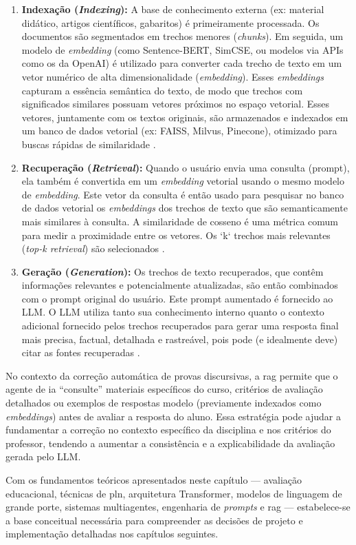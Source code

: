 \begin{enumerate}
    \item \textbf{Indexação (\textit{Indexing}):} A base de conhecimento externa (ex: material didático, artigos científicos, gabaritos) é primeiramente processada. Os documentos são segmentados em trechos menores (\textit{chunks}). Em seguida, um modelo de \textit{embedding} (como Sentence-BERT, SimCSE, ou modelos via APIs como os da OpenAI) é utilizado para converter cada trecho de texto em um vetor numérico de alta dimensionalidade (\textit{embedding}). Esses \textit{embeddings} capturam a essência semântica do texto, de modo que trechos com significados similares possuam vetores próximos no espaço vetorial. Esses vetores, juntamente com os textos originais, são armazenados e indexados em um banco de dados vetorial (ex: FAISS, Milvus, Pinecone), otimizado para buscas rápidas de similaridade \cite{gao_retrieval-augmented_2024, khattab_colbert_2020}.

    \item \textbf{Recuperação (\textit{Retrieval}):} Quando o usuário envia uma consulta (prompt), ela também é convertida em um \textit{embedding} vetorial usando o mesmo modelo de \textit{embedding}. Este vetor da consulta é então usado para pesquisar no banco de dados vetorial os \textit{embeddings} dos trechos de texto que são semanticamente mais similares à consulta. A similaridade de cosseno é uma métrica comum para medir a proximidade entre os vetores. Os `k` trechos mais relevantes (\textit{top-k retrieval}) são selecionados \cite{gao_retrieval-augmented_2024, gao_precise_2022}.

    \item \textbf{Geração (\textit{Generation}):}  Os trechos de texto recuperados, que contêm informações relevantes e potencialmente atualizadas, são então combinados com o prompt original do usuário. Este prompt aumentado é fornecido ao LLM. O LLM utiliza tanto sua conhecimento interno quanto o contexto adicional fornecido pelos trechos recuperados para gerar uma resposta final mais precisa, factual, detalhada e rastreável, pois pode (e idealmente deve) citar as fontes recuperadas \cite{gao_retrieval-augmented_2024, ram_-context_2023}.
\end{enumerate}

No contexto da correção automática de provas discursivas, a \gls{rag} permite que o agente de \gls{ia} ``consulte'' materiais específicos do curso, critérios de avaliação detalhados ou exemplos de respostas modelo (previamente indexados como \textit{embeddings}) antes de avaliar a resposta do aluno. Essa estratégia pode ajudar a fundamentar a correção no contexto específico da disciplina e nos critérios do professor, tendendo a aumentar a consistência e a explicabilidade da avaliação gerada pelo LLM.

Com os fundamentos teóricos apresentados neste capítulo --- avaliação educacional, técnicas de \gls{pln}, arquitetura Transformer, modelos de linguagem de grande porte, sistemas multiagentes, engenharia de \textit{prompts} e \gls{rag} --- estabelece-se a base conceitual necessária para compreender as decisões de projeto e implementação detalhadas nos capítulos seguintes.
